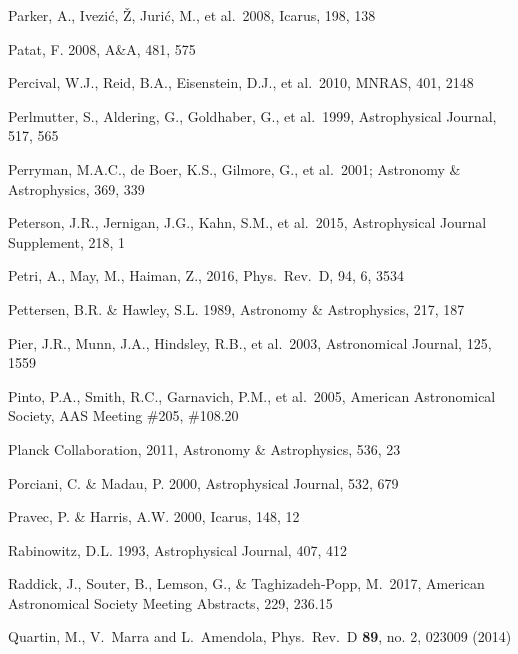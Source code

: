 \documentclass[twocolumn]{aastex61}
\begin{document}
\begin{thebibliography}{}
 Parker, A., Ivezi\'{c}, \v{Z}, Juri\'{c}, M., et al.~2008, Icarus, 198, 138

 Patat, F. 2008, A\&A, 481, 575

 Percival, W.J., Reid, B.A., Eisenstein, D.J., et al.~2010, MNRAS, 401, 2148

 Perlmutter, S., Aldering, G., Goldhaber, G., et al.~1999, Astrophysical Journal, 517, 565

 Perryman, M.A.C., de Boer, K.S., Gilmore, G., et al.~2001; Astronomy \& Astrophysics, 369, 339

 Peterson, J.R., Jernigan, J.G., Kahn, S.M., et al.~2015, Astrophysical Journal Supplement, 218, 1

 Petri, A., May, M., Haiman, Z., 2016, Phys.~Rev.~D, 94, 6, 3534

 Pettersen, B.R. \& Hawley, S.L. 1989, Astronomy \& Astrophysics, 217, 187

 Pier, J.R., Munn, J.A., Hindsley, R.B., et al.~2003, Astronomical Journal, 125, 1559

 Pinto, P.A., Smith, R.C., Garnavich, P.M., et al.~2005, American Astronomical Society, AAS Meeting \#205, \#108.20

 Planck Collaboration, 2011,  Astronomy \& Astrophysics, 536, 23

 Porciani, C. \& Madau, P. 2000, Astrophysical Journal, 532, 679

 Pravec, P. \& Harris, A.W. 2000, Icarus, 148, 12

 Rabinowitz, D.L. 1993,  Astrophysical Journal, 407, 412

 Raddick, J., Souter, B., Lemson, G., \& Taghizadeh-Popp, M.\ 2017, American Astronomical Society Meeting Abstracts, 229, 236.15

 Quartin, M., V.~Marra and L.~Amendola, Phys.\ Rev.\ D {\bf 89}, no. 2, 023009 (2014)


\end{thebibliography}
\end{document}
